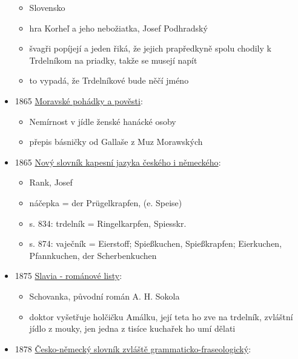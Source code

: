 \begin{itemize}
  \begin{itemize}
  \tightlist
  \item
    Slovensko
  \item
    hra Korheľ a jeho nebožiatka, Josef Podhradský
  \item
    švagři popíjejí a jeden řiká, že jejich prapředkyně spolu chodily k
    Trdelníkom na priadky, takže se musejí napít
  \item
    to vypadá, že Trdelníkové bude něčí jméno
  \end{itemize}
\item
  1865
  \href{https://www.google.cz/books/edition/Moravske_pohadkya_povesti_M\%C3\%A4hrische_M\%C3\%A4/42qLW6-LrScC?hl=cs&gbpv=1&pg=PA139&printsec=frontcover}{Moravské
  pohádky a pověsti}:

  \begin{itemize}
  \tightlist
  \item
    Nemírnost v jídle ženské hanácké osoby
  \item
    přepis básničky od Gallaše z Muz Morawských
  \end{itemize}
\item
  1865
  \href{https://ceskadigitalniknihovna.cz/uuid/uuid:a738d13c-8062-4352-9707-b5ae338b4873}{Nový
  slovník kapesní jazyka českého i německého}:

  \begin{itemize}
  \tightlist
  \item
    Rank, Josef
  \item
    náčepka = der Prügelkrapfen, (e. Speise)
  \item
    s. 834: trdelník = Ringelkarpfen, Spiesskr.
  \item
    s. 874: vaječník = Eierstoff; Spießkuchen, Spießkrapfen; Eierkuchen,
    Pfannkuchen, der Scherbenkuchen
  \end{itemize}
\item
  1875
  \href{https://www.google.cz/books/edition/Slavia/WrJiAAAAcAAJ?hl=cs&gbpv=1&dq=trdeln\%C3\%ADk&pg=PA312&printsec=frontcover}{Slavia
  - románové listy}:

  \begin{itemize}
  \tightlist
  \item
    Schovanka, původní román A. H. Sokola
  \item
    doktor vyšetřuje holčičku Amálku, její teta ho zve na trdelník,
    zvláštní jídlo z mouky, jen jedna z tisíce kuchařek ho umí dělati
  \end{itemize}
\item
  1878
  \href{https://www.google.cz/books/edition/\%C4\%8Cesko_n\%C4\%9Bmeck\%C3\%BD_slovn\%C3\%ADk_zvl\%C3\%A1\%C5\%A1t\%C4\%9B_gra/4r00AQAAMAAJ?hl=cs&gbpv=1&dq=trdeln\%C3\%ADk&pg=PA586&printsec=frontcover}{Česko-německý
  slovník zvláště grammaticko-fraseologický}:


\end{itemize}
